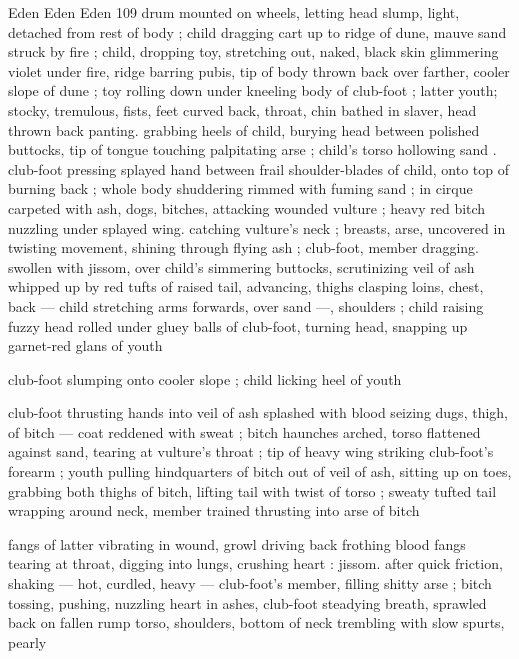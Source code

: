 Eden Eden Eden 109
drum mounted on wheels, letting head slump, light, detached from
rest of body ; child dragging cart up to ridge of dune, mauve sand
struck by fire ; child, dropping toy, stretching out, naked, black skin
glimmering violet under fire, ridge barring pubis, tip of body thrown
back over farther, cooler slope of dune ; toy rolling down under
kneeling body of club-foot ; latter youth; stocky, tremulous, fists, feet
curved back, throat, chin bathed in slaver, head thrown back panting.
grabbing heels of child, burying head between polished buttocks, tip
of tongue touching palpitating arse ; child's torso hollowing sand .
club-foot pressing splayed hand between frail shoulder-blades of
child, onto top of burning back ; whole body shuddering rimmed with
fuming sand ; in cirque carpeted with ash, dogs, bitches, attacking
wounded vulture ; heavy red bitch nuzzling under splayed wing.
catching vulture's neck ; breasts, arse, uncovered in twisting
movement, shining through flying ash ; club-foot, member dragging.
swollen with jissom, over child's simmering buttocks, scrutinizing veil
of ash whipped up by red tufts of raised tail, advancing, thighs
clasping loins, chest, back — child stretching arms forwards, over
sand —, shoulders ; child raising fuzzy head rolled under gluey balls
of club-foot, turning head, snapping up garnet-red glans of youth

club-foot slumping onto cooler slope ; child licking heel of youth

club-foot thrusting hands into veil of ash splashed with blood
seizing dugs, thigh, of bitch — coat reddened with sweat ; bitch
haunches arched, torso flattened against sand, tearing at vulture’s
throat ; tip of heavy wing striking club-foot's forearm ; youth pulling
hindquarters of bitch out of veil of ash, sitting up on toes, grabbing
both thighs of bitch, lifting tail with twist of torso ; sweaty tufted tail
wrapping around neck, member trained thrusting into arse of bitch

fangs of latter vibrating in wound, growl driving back frothing blood
fangs tearing at throat, digging into lungs, crushing heart : jissom.
after quick friction, shaking — hot, curdled, heavy — club-foot's
member, filling shitty arse ; bitch tossing, pushing, nuzzling heart in
ashes, club-foot steadying breath, sprawled back on fallen rump
torso, shoulders, bottom of neck trembling with slow spurts, pearly

